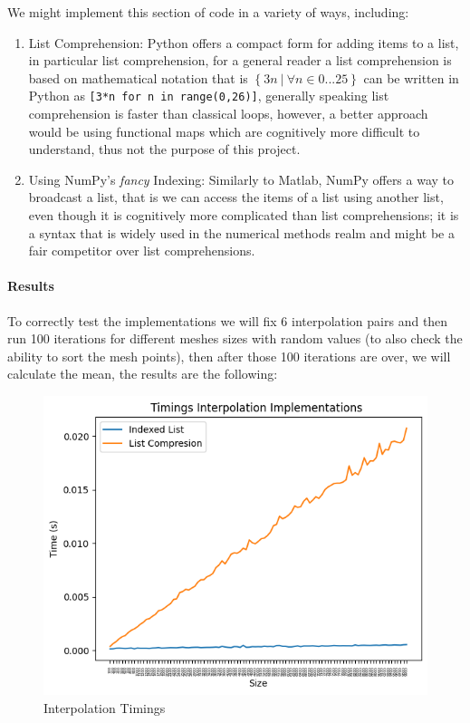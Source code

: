 We might implement this section of code in a variety of ways, including:
\begin{enumerate}
    \item List Comprehension: Python offers a compact form for adding items to a list, in particular list comprehension, for a general reader a list comprehension is based on mathematical notation that is $\left\{ 3n\ |\ \forall n\in 0...25\right\}$ can be written in Python as \lstinline|[3*n for n in range(0,26)]|, generally speaking list comprehension is faster than classical loops\cite{PythonSpeedPerformanceTips}, however, a better approach would be using functional maps which are cognitively more difficult to understand, thus not the purpose of this project.

    \item Using NumPy's \textit{fancy} Indexing: Similarly to Matlab, NumPy offers a way to broadcast a list, that is we can access the items of a list using another list, even though it is cognitively more complicated than list comprehensions; it is a syntax that is widely used in the numerical methods realm and might be a fair competitor over list comprehensions.
    
\end{enumerate}
\paragraph{Results}
To correctly test the implementations we will fix 6 interpolation pairs and then run 100 iterations for different meshes sizes with random values (to also check the ability to sort the mesh points), then after those 100 iterations are over, we will calculate the mean, the results are the following:
\begin{figure}[H]
    \centering
    \includegraphics[scale=0.9]{Include/Images/Thesis/Analysis of Solutions/Interpolation/Interpolation Timings.png}
    \caption{Interpolation Timings}
    \label{fig:Interpolation Timings}
\end{figure}

